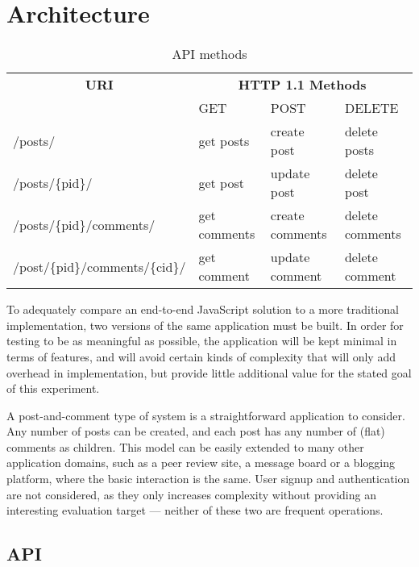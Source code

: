 \section{\label{sec:arch}Architecture}

\begin{table*}
    \centering
    \begin{tabular}{*{4}l}
        \toprule
        \multicolumn{1}{c}{\textbf{URI}} & \multicolumn{3}{c}{\textbf{HTTP 1.1 Methods}} \\
        \cmidrule{2-4}
        & GET & POST & DELETE \\
        \midrule
        /posts/ & get posts & create post & delete posts \\
        /posts/\{pid\}/ & get post & update post & delete post \\
        /posts/\{pid\}/comments/ & get comments & create comments & delete comments \\
        /post/\{pid\}/comments/\{cid\}/ & get comment & update comment & delete comment \\
        \bottomrule
    \end{tabular}
    \caption{API methods}
    \label{tab:api}
\end{table*}


To adequately compare an end-to-end JavaScript solution to a more traditional implementation, two versions of the same application must be built. In order for testing to be as meaningful as possible, the application will be kept minimal in terms of features, and will avoid certain kinds of complexity that will only add overhead in implementation, but provide little additional value for the stated goal of this experiment.

A post-and-comment type of system is a straightforward application to consider. Any number of posts can be created, and each post has any number of (flat) comments as children. This model can be easily extended to many other application domains, such as a peer review site, a message board or a blogging platform, where the basic interaction is the same. User signup and authentication are not considered, as they only increases complexity without providing an interesting evaluation target --- neither of these two are frequent operations.

\subsection{\label{sec:arch:API}API}

